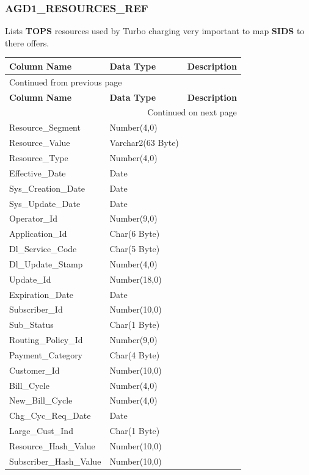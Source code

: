 \documentclass[12pt,twoside]{article}
\begin{document}
\subsubsection{AGD1\_RESOURCES\_REF}
\label{sec:orgheadline102}
Lists \textbf{TOPS} resources used by Turbo charging very important to map \textbf{SIDS} to there offers.
\footnotesize
\begin{longtable}{l|l|l}
\hline
\textbf{Column Name} & \textbf{Data Type} & \textbf{Description}\\
\hline
\endfirsthead
\multicolumn{3}{l}{Continued from previous page} \\
\hline

\textbf{Column Name} & \textbf{Data Type} & \textbf{Description} \\

\hline
\endhead
\hline\multicolumn{3}{r}{Continued on next page} \\
\endfoot
\endlastfoot
\hline
Resource\_Segment & Number(4,0) & \\
Resource\_Value & Varchar2(63 Byte) & \\
Resource\_Type & Number(4,0) & \\
Effective\_Date & Date & \\
Sys\_Creation\_Date & Date & \\
Sys\_Update\_Date & Date & \\
Operator\_Id & Number(9,0) & \\
Application\_Id & Char(6 Byte) & \\
Dl\_Service\_Code & Char(5 Byte) & \\
Dl\_Update\_Stamp & Number(4,0) & \\
Update\_Id & Number(18,0) & \\
Expiration\_Date & Date & \\
Subscriber\_Id & Number(10,0) & \\
Sub\_Status & Char(1 Byte) & \\
Routing\_Policy\_Id & Number(9,0) & \\
Payment\_Category & Char(4 Byte) & \\
Customer\_Id & Number(10,0) & \\
Bill\_Cycle & Number(4,0) & \\
New\_Bill\_Cycle & Number(4,0) & \\
Chg\_Cyc\_Req\_Date & Date & \\
Large\_Cust\_Ind & Char(1 Byte) & \\
Resource\_Hash\_Value & Number(10,0) & \\
Subscriber\_Hash\_Value & Number(10,0) & \\
\hline
\end{longtable}
\normalsize
\end{document}
